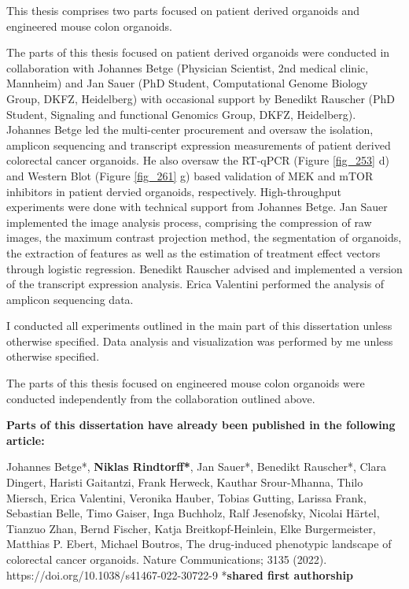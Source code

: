 \begin{flushleft}
This thesis comprises two parts focused on patient derived organoids and engineered mouse colon organoids. 
\bigbreak

The parts of this thesis focused on patient derived organoids were conducted in collaboration with Johannes Betge (Physician Scientist, 2nd medical clinic, Mannheim) and Jan Sauer (PhD Student, Computational Genome Biology Group, DKFZ, Heidelberg) with occasional support by Benedikt Rauscher (PhD Student, Signaling and functional Genomics Group, DKFZ, Heidelberg). 
\smallbreak
Johannes Betge led the multi-center procurement and oversaw the isolation, amplicon sequencing and transcript expression measurements of patient derived colorectal cancer organoids. He also oversaw the RT-qPCR (Figure \ref{fig_253} d) and Western Blot (Figure \ref{fig_261} g) based validation of MEK and mTOR inhibitors in patient dervied organoids, respectively. High-throughput experiments were done with technical support from Johannes Betge. 
\smallbreak
Jan Sauer implemented the image analysis process, comprising the compression of raw images, the maximum contrast projection method, the segmentation of organoids, the extraction of features as well as the estimation of treatment effect vectors through logistic regression. 
\smallbreak
Benedikt Rauscher advised and implemented a version of the transcript expression analysis. 
\smallbreak
Erica Valentini performed the analysis of amplicon sequencing data. \par
I conducted all experiments outlined in the main part of this dissertation unless otherwise specified. Data analysis and visualization was performed by me unless otherwise specified. 
\bigbreak

The parts of this thesis focused on engineered mouse colon organoids were conducted independently from the collaboration outlined above.
\bigbreak

\textbf{Parts of this dissertation have already been published in the following article:}
\bigbreak

Johannes Betge*, \textbf{Niklas Rindtorff*}, Jan Sauer*, Benedikt Rauscher*, Clara Dingert, Haristi Gaitantzi, Frank Herweck, Kauthar Srour-Mhanna, Thilo Miersch, Erica Valentini, Veronika Hauber, Tobias Gutting, Larissa Frank, Sebastian Belle, Timo Gaiser, Inga Buchholz, Ralf Jesenofsky, Nicolai Härtel, Tianzuo Zhan, Bernd Fischer, Katja Breitkopf-Heinlein, Elke Burgermeister, Matthias P. Ebert, Michael Boutros, The drug-induced phenotypic landscape of colorectal cancer organoids. Nature Communications; 3135 (2022). https://doi.org/10.1038/s41467-022-30722-9 *\textbf{shared first authorship}


\end{flushleft}
